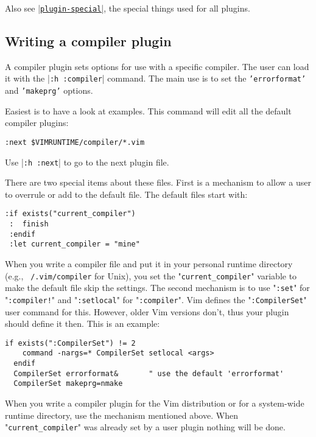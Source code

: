 Also see \hyperref[plugin-special]{|\texttt{plugin-special}|}, the special things used for all plugins.
\subsection{Writing a compiler plugin}
\label{write-compiler-plugin}
A compiler plugin sets options for use with a specific compiler.
The user can load it with the |\texttt{:h :compiler}| command.
The main use is to set the \texttt{'errorformat'} and \texttt{'makeprg'} options.

Easiest is to have a look at examples.
This command will edit all the default compiler plugins:

\begin{Verbatim}[samepage=true]
 :next $VIMRUNTIME/compiler/*.vim
\end{Verbatim}

Use |\texttt{:h :next}| to go to the next plugin file.

There are two special items about these files.
First is a mechanism to allow a user to overrule or add to the default file.
The default files start with:

\begin{Verbatim}[samepage=true]
 :if exists("current_compiler")
 :  finish
 :endif
 :let current_compiler = "mine"
\end{Verbatim}

When you write a compiler file and put it in your personal runtime directory (e.g., \texttt{~/.vim/compiler} for Unix), you set the "\texttt{current\_compiler}" variable to make the default file skip the settings.
\label{:CompilerSet}
The second mechanism is to use "\texttt{:set}" for "\texttt{:compiler!}" and "\texttt{:setlocal}" for "\texttt{:compiler}".
Vim defines the "\texttt{:CompilerSet}" user command for this.
However, older Vim versions don't, thus your plugin should define it then.
This is an example:

\begin{Verbatim}[samepage=true]
  if exists(":CompilerSet") != 2
    command -nargs=* CompilerSet setlocal <args>
  endif
  CompilerSet errorformat&       " use the default 'errorformat'
  CompilerSet makeprg=nmake
\end{Verbatim}

When you write a compiler plugin for the Vim distribution or for a system-wide runtime directory, use the mechanism mentioned above.
When "\texttt{current\_compiler}" was already set by a user plugin nothing will be done.


